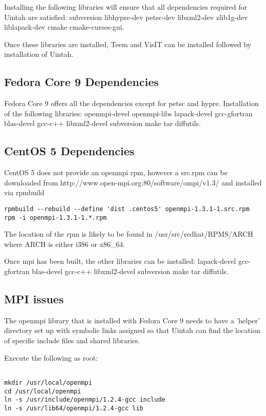 Installing the following libraries will ensure that all dependencies
required for Uintah are satisfied: subversion libhypre-dev petsc-dev
libxml2-dev zlib1g-dev liblapack-dev cmake cmake-curses-gui.

Once these libraries are installed, Teem and VisIT can be installed
followed by installation of Uintah.

\subsection{Fedora Core 9 Dependencies}

Fedora Core 9 offers all the dependencies except for petsc and hypre.
Installation of the following libraries: openmpi-devel openmpi-libs
lapack-devel gcc-gfortran blas-devel gcc-c++ libxml2-devel subversion
make tar diffutils.

\subsection{CentOS 5 Dependencies}

CentOS 5 does not provide an openmpi rpm, however a src.rpm can be
downloaded from http://www.open-mpi.org:80/software/ompi/v1.3/ and
installed via rpmbuild

\begin{Verbatim}
rpmbuild --rebuild --define 'dist .centos5' openmpi-1.3.1-1.src.rpm
rpm -i openmpi-1.3.1-1.*.rpm
\end{Verbatim}

The location of the rpm is likely to be found in
/usr/src/redhat/RPMS/ARCH where ARCH is either i386 or x86\_64.

Once mpi has been built, the other libraries can be installed:
lapack-devel gcc-gfortran blas-devel gcc-c++ libxml2-devel subversion
make tar diffutils.

\subsection{MPI issues}

The openmpi library that is installed with Fedora Core 9 needs to have
a 'helper' directory set up with symbolic links assigned so that
Uintah can find the location of specific include files and shared
libraries.

Execute the following as root:

\begin{Verbatim}

mkdir /usr/local/openmpi
cd /usr/local/openmpi
ln -s /usr/include/openmpi/1.2.4-gcc include
ln -s /usr/lib64/openmpi/1.2.4-gcc lib

\end{Verbatim}



